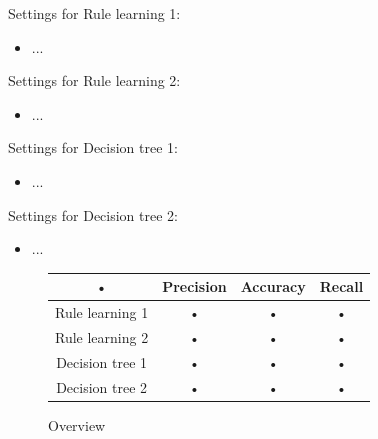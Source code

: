 \documentclass[12pt,a4paper]{article}
\begin{document}
Settings for Rule learning 1:
\begin{itemize}
\item ...
\end{itemize}

Settings for Rule learning 2:
\begin{itemize}
\item ...
\end{itemize}

Settings for Decision tree 1:
\begin{itemize}
\item ...
\end{itemize}

Settings for Decision tree 2:
\begin{itemize}
\item ...
\end{itemize}

\begin{figure}[H]
\centering
\begin{tabular}{|c|c|c|c|}
\hline 
• & Precision & Accuracy & Recall\\ 
\hline 
Rule learning 1 & • & • & • \\ 
\hline 
Rule learning 2 & • & • & • \\ 
\hline 
Decision tree 1 & • & • & • \\ 
\hline 
Decision tree 2 & • & • & • \\ 
\hline 
\end{tabular} 
\caption{Overview}
\end{figure}
\end{document}
